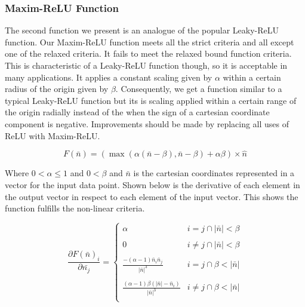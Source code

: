 \documentclass[onecolumn]{article}
\begin{document}
    \subsubsection{Maxim-ReLU Function}
    The second function we present is an analogue of the popular Leaky-ReLU function. Our Maxim-ReLU function meets all the strict criteria and all except one of the relaxed criteria. It fails to meet the relaxed bound function criteria. This is characteristic of a Leaky-ReLU function though, so it is acceptable in many applications. It applies a constant scaling given by $\alpha$ within a certain radius of the origin given by $\beta$. Consequently, we get a function similar to a typical Leaky-ReLU function but its is scaling applied within a certain range of the origin radially instead of the when the sign of a cartesian coordinate component is negative. Improvements should be made by replacing all uses of ReLU with Maxim-ReLU.
    
    \begin{equation}
        \label{eqn: Maxim-ReLU Function}
        F\left(\bar{n}\right)=\left(\max\left(\alpha\left(\bar{n}-\beta\right),\bar{n}-\beta\right)+\alpha\beta\right)\times\hat{n} 
    \end{equation}

    Where ${0} < \alpha \leq {1}$ and ${0} < \beta$ and $\bar{n}$ is the cartesian coordinates represented in a vector for the input data point. Shown below is the derivative of each element in the output vector in respect to each element of the input vector. This shows the function fulfills the non-linear criteria.

    \[\frac{\partial F\left(\bar{n}\right)_{i}}{\partial \bar{n_{j}}}=\left\{
    \begin{array}{ll}
        \alpha & i = j \cap |\bar{n}|<\beta \\\\
        0 & i \neq j \cap |\bar{n}|<\beta \\\\
        \frac{-\left(\alpha-1\right)\bar{n}_{i}\bar{n}_{j}}{|\bar{n}|^{3}} & i = j \cap \beta<|\bar{n}|  \\\\
        \frac{\left(\alpha-1\right)\beta\left(|\bar{n}|-\bar{n}_{i}\right)}{|\bar{n}|^{3}} & i \neq j \cap \beta<|\bar{n}| \\

    \end{array} 
    \right. \]
\end{document}
